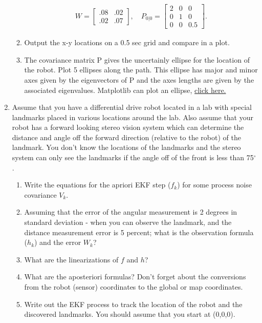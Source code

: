 \begin{enumerate}
\begin{enumerate}
    \[\begin{aligned}
    W= \begin{bmatrix} .08& .02 \\.02&  .07\end{bmatrix}, \quad P_{0|0} = \begin{bmatrix}2 &0& 0\\0 &1& 0\\0& 0& 0.5\end{bmatrix}.
    \end{aligned}\]
  \item
    Output the x-y locations on a 0.5 sec grid and compare in a plot.
  \item
    The covariance matrix P gives the uncertainly ellipse for the
    location of the robot. Plot 5 ellipses along the path. This ellipse
    has major and minor axes given by the eigenvectors of P and the axes
    lengths are given by the associated eigenvalues. Matplotlib can plot
    an ellipse,
    \href{https://matplotlib.org/api/_as_gen/matplotlib.patches.Ellipse.html\#matplotlib.patches.Ellipse}{click
    here.}
  \end{enumerate}
\item
  Assume that you have a differential drive robot located in a lab with
  special landmarks placed in various locations around the lab. Also
  assume that your robot has a forward looking stereo vision system
  which can determine the distance and angle off the forward direction
  (relative to the robot) of the landmark. You don't know the locations
  of the landmarks and the stereo system can only see the landmarks if
  the angle off of the front is less than 75\(^{\circ}\).

  \begin{enumerate}
  \def\labelenumii{\alph{enumii}.}
  \tightlist
  \item
    Write the equations for the apriori EKF step (\(f_k\)) for some
    process noise covariance \(V_k\).
  \item
    Assuming that the error of the angular measurement is 2 degrees in
    standard deviation - when you can observe the landmark, and the
    distance measurement error is 5 percent; what is the observation
    formula (\(h_k\)) and the error \(W_k\)?
  \item
    What are the linearizations of \(f\) and \(h\)?
  \item
    What are the aposteriori formulas? Don't forget about the
    conversions from the robot (sensor) coordinates to the global or map
    coordinates.
  \item
    Write out the EKF process to track the location of the robot and the
    discovered landmarks. You should assume that you start at (0,0,0).
  \end{enumerate}
\end{enumerate}

